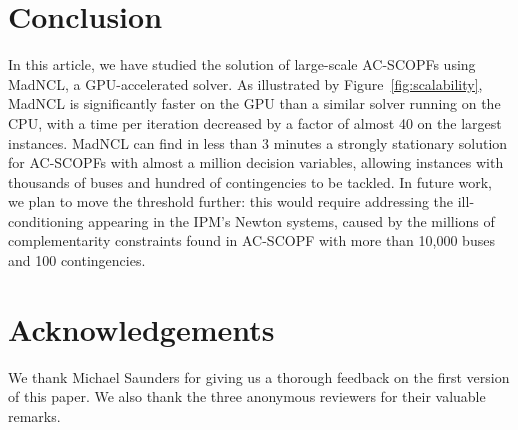 \documentclass{IEEEtran4PSCC}
\begin{document}
\section{Conclusion}

In this article, we have studied the solution of large-scale AC-SCOPFs
using MadNCL, a GPU-accelerated solver. As illustrated by Figure~\ref{fig:scalability},
MadNCL is significantly faster on the GPU than a similar solver running on the CPU,
with a time per iteration decreased by a factor of almost 40 on the largest instances.
MadNCL can find in less than 3 minutes a strongly stationary solution for AC-SCOPFs with almost a million decision variables, allowing instances with thousands of buses and
hundred of contingencies to be tackled. In future work, we plan to move the threshold further:
this would require addressing the ill-conditioning appearing in the IPM's Newton systems,
caused by the millions of complementarity constraints found in AC-SCOPF with
more than 10,000 buses and 100 contingencies.

\section*{Acknowledgements}
We thank Michael Saunders for giving us a thorough feedback on the first version
of this paper. We also thank the three anonymous reviewers for their valuable remarks.

%
%

\end{document}
